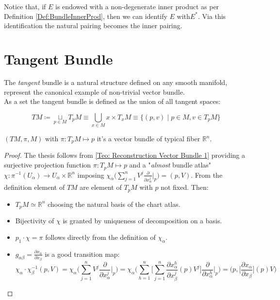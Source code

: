 \documentclass[a4paper,12pt]{scrartcl}    %
\begin{document}
\begin{observation}
	Notice that, if $E$ is endowed with a non-degenerate inner product as per Definition \ref{Def:BundleInnerProd}, then we can identify $E$ with$E^*$. Via this identification the natural pairing becomes the inner pairing.
\end{observation}

\newpage
\section{Tangent Bundle}
The \emph{tangent} bundle is a natural structure defined on any smooth manifold, represent the canonical example of  non-trivial vector bundle.
\vspace{6mm}
\\
As a set the tangent bundle is defined as the union of all tangent spaces:
\begin{definition}
\begin{displaymath}
	TM \coloneqq \underset{p \in M}{\sqcup} T_pM 
	\equiv \bigcup_{x\in M} {x}\times T_x M 
	\equiv \{ (p,v) \; \big\vert \; p\in M, v \in T_pM \}
\end{displaymath}
\end{definition}

\begin{corollary}
$ (TM, \pi, M)$ with $\pi: T_p M \mapsto {p}$ it's a vector bundle of typical fiber $\mathbb{R}^n$.
\end{corollary}
\begin{proof}
The thesis follows from \ref{Teo: Reconstruction Vector Bundle 1} providing a surjective projection function $\pi : T_p M \mapsto {p}$ and a "\emph{almost} bundle atlas" $\chi: \pi^{-1} ( U_\alpha) \rightarrow U_\alpha \times \mathbb{R}^n $ imposing $\chi_\alpha \big( \sum_{j=1}^n V^j \frac{\partial}{\partial x_\alpha^j} \big\vert_p \big) = (p,V) $.
From the definition element of $TM$ are element of $T_pM$ with $p$ not fixed. Then:
\begin{itemize}
\item $T_pM \simeq \mathbb{R}^n$ choosing the natural basis of the chart atlas.
\item Bijectivity of $\chi$ is granted by uniqueness of decomposition on a basis.
\item $p_1 \cdot \chi = \pi $ follows directly from the definition of $\chi_\alpha$.
\item $g_{\alpha \beta} = \frac{\partial x_\alpha}{\partial x_\beta}$ is a good transition map:
\begin{displaymath}
\chi_\alpha \cdot \chi_\beta ^{-1} (p,V) = \chi_\alpha \Big( \sum_{j=1}^n V^j \frac{\partial}{\partial x_\alpha^j} \big\vert_p \Big) = \chi_\alpha \Big( \sum_{h=1}^n \Big [ \sum_{j=1}^n \frac{\partial x_\alpha ^h}{\partial x_\beta^j}(p) V^j\Big] \frac{\partial}{\partial x_\alpha^h} \big\vert_p \Big) = \Big( p, \Big[\frac{\partial x_\alpha}{\partial x_\beta}\Big](p) V \Big)
\end{displaymath}
\end{itemize}
\end{proof}
\end{document}
